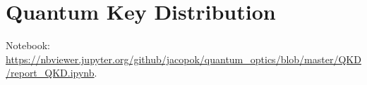 \documentclass[main.tex]{subfiles}
\begin{document}
\section{Quantum Key Distribution}

Notebook: \url{https://nbviewer.jupyter.org/github/jacopok/quantum_optics/blob/master/QKD/report_QKD.ipynb}.
\end{document}
